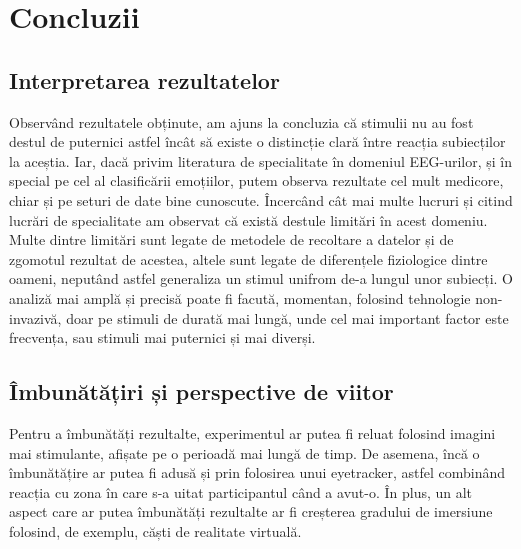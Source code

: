 \chapter{Concluzii}

\section{Interpretarea rezultatelor}

Observând rezultatele obținute, am ajuns la concluzia că stimulii nu au fost destul de puternici astfel încât să existe o distincție clară între reacția subiecților la aceștia. Iar, dacă privim literatura de specialitate în domeniul EEG-urilor, și în special pe cel al clasificării emoțiilor, putem observa rezultate cel mult medicore\cite{recreation_attempt}, chiar și pe seturi de date bine cunoscute. Încercând cât mai multe lucruri și citind lucrări de specialitate am observat că există destule limitări în acest domeniu. Multe dintre limitări sunt legate de metodele de recoltare a datelor și de zgomotul rezultat de acestea, altele sunt legate de diferențele fiziologice dintre oameni, neputând astfel generaliza un stimul unifrom de-a lungul unor subiecți. O analiză mai amplă și precisă poate fi facută, momentan, folosind tehnologie non-invazivă, doar pe stimuli de durată mai lungă, unde cel mai important factor este frecvența, sau stimuli mai puternici și mai diverși. 

\section{Îmbunătățiri și perspective de viitor}

Pentru a îmbunătăți rezultalte, experimentul ar putea fi reluat folosind imagini mai stimulante, afișate pe o perioadă mai lungă de timp. De asemena, încă o îmbunătățire ar putea fi adusă și prin folosirea unui eyetracker, astfel combinând reacția cu zona în care s-a uitat participantul când a avut-o. În plus, un alt aspect care ar putea îmbunătăți rezultalte ar fi creșterea gradului de imersiune folosind, de exemplu, căști de realitate virtuală.